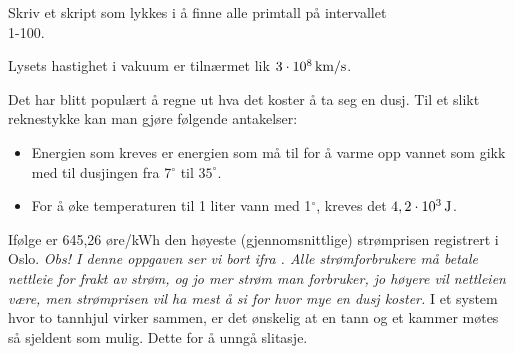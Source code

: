\newpage
{}
Skriv et skript som lykkes i å finne alle primtall på intervallet\\ 1-100.

Lysets hastighet i vakuum er tilnærmet lik $ 3\cdot10^8\,\text{km/s} $.


Det har blitt populært å regne ut hva det koster å ta seg en dusj. Til et slikt reknestykke kan man gjøre følgende antakelser:
\begin{itemize}
	\item Energien som kreves er energien som må til for å varme opp vannet som gikk med til dusjingen fra 7$^\circ $ til $ 35^\circ $.
	\item For å øke temperaturen til 1 liter vann med 1$ ^\circ $, kreves det $ 4,2\cdot10^3\,\text{J} $.
\end{itemize}
Ifølge  er 645,26 øre/kWh den høyeste (gjennomsnittlige) strømprisen registrert i Oslo. 
\textit{\small Obs! I denne oppgaven ser vi bort ifra . Alle strømforbrukere må betale nettleie for frakt av strøm, og jo mer strøm man forbruker, jo høyere vil nettleien være, men strømprisen vil ha mest å si for hvor mye en dusj koster.}
\newpage
{}
I et system hvor to tannhjul virker sammen, er det ønskelig at en tann og et kammer møtes så sjeldent som mulig. Dette for å unngå slitasje. \vsk

